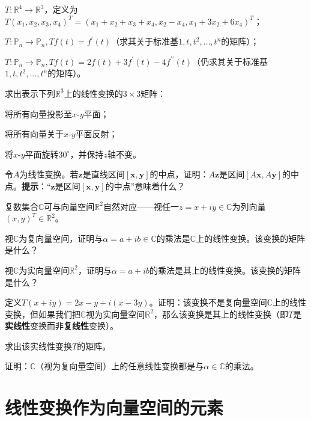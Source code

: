 \begin{problemset}
\begin{probenumerate}
        \item $T:\mathbb{R}^4\to\mathbb{R}^3$，定义为$T(x_{1},x_{2},x_{3},x_{4})^{T}=(x_{1}+x_{2}+x_{3}+x_{4},x_{2}-x_{4},x_{1}+3x_{2}+6x_{4})^T$；
        \item $T:\mathbb{P}_{n}\to\mathbb{P}_{n},Tf(t)=f^{\prime}(t)$（求其关于标准基$1,t,t^2,\ldots,t^n$的矩阵）；
        \item $T:\mathbb{P}_{n}\to\mathbb{P}_{n},Tf(t)=2f(t)+3f^{\prime}(t)-4f^{\prime\prime}(t)$（仍求其关于标准基$1,t,t^2,\ldots,t^n$的矩阵）。
    \end{probenumerate}
    \item 求出表示下列$\mathbb{R}^3$上的线性变换的$3\times 3$矩阵：
    \begin{probenumerate}
        \item 将所有向量投影至$x$-$y$平面；
        \item 将所有向量关于$x$-$y$平面反射；
        \item 将$x$-$y$平面旋转$30^\circ$，并保持$z$轴不变。
    \end{probenumerate}
    \item 令$A$为线性变换。若$\mathbf{z}$是直线区间$[\mathbf{x},\mathbf{y}]$的中点，证明：$A\mathbf{z}$是区间$[A\mathbf{x},A\mathbf{y}]$的中点。{\bf 提示}：“$\mathbf{z}$是区间$[\mathbf{x},\mathbf{y}]$的中点”意味着什么？
    \item 复数集合$\mathbb{C}$可与向量空间$\mathbb{R}^2$自然对应——视任一$z=x+iy\in\mathbb{C}$为列向量$(x,y)^T\in\mathbb{R}^2$。
    \begin{probenumerate}
        \item 视$\mathbb{C}$为复向量空间，证明与$\alpha=a+ib\in\mathbb{C}$的乘法是$\mathbb{C}$上的线性变换。该变换的矩阵是什么？
        \item 视$\mathbb{C}$为实向量空间$\mathbb{R}^2$，证明与$\alpha=a+ib$的乘法是其上的线性变换。该变换的矩阵是什么？
        \item 定义$T(x+iy)=2x-y+i(x-3y)$。证明：该变换不是复向量空间$\mathbb{C}$上的线性变换，但如果我们把$\mathbb{C}$视为实向量空间$\mathbb{R}^2$，那么该变换是其上的线性变换（即$T$是{\bf 实线性}变换而非{\bf 复线性}变换）。
        
        求出该实线性变换$T$的矩阵。
    \end{probenumerate}
    \item 证明：$\mathbb{C}$（视为复向量空间）上的任意线性变换都是与$\alpha\in\mathbb{C}$的乘法。
\end{problemset}

\section{线性变换作为向量空间的元素}\label{sec:linear_transformations_as_vectors}

